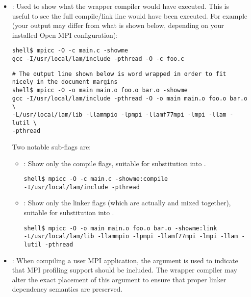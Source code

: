 \begin{itemize}
\item {}: Used to show what the wrapper compiler would
  have executed.  This is useful to see the full compile/link line
  would have been executed.  For example (your output may differ from
  what is shown below, depending on your installed Open MPI
  configuration):

  \lstset{style=lam-cmdline}
  \begin{lstlisting}
shell$ mpicc -O -c main.c -showme
gcc -I/usr/local/lam/include -pthread -O -c foo.c
  \end{lstlisting}
  \lstset{style=lam-cmdline}
  \begin{lstlisting}
# The output line shown below is word wrapped in order to fit nicely in the document margins
shell$ mpicc -O -o main main.o foo.o bar.o -showme
gcc -I/usr/local/lam/include -pthread -O -o main main.o foo.o bar.o \
-L/usr/local/lam/lib -llammpio -lpmpi -llamf77mpi -lmpi -llam -lutil \
-pthread 
  \end{lstlisting}


  Two notable sub-flags are:

  \begin{itemize}
  \item {}: Show only the compile flags,
    suitable for substitution into .
    
  \lstset{style=lam-cmdline}
  \begin{lstlisting}
shell$ mpicc -O -c main.c -showme:compile
-I/usr/local/lam/include -pthread
  \end{lstlisting}

  \item {}: Show only the linker flags (which are
    actually  and  mixed together),
    suitable for substitution into \envvar{LIBS}.

  \lstset{style=lam-cmdline}
  \begin{lstlisting}
shell$ mpicc -O -o main main.o foo.o bar.o -showme:link
-L/usr/local/lam/lib -llammpio -lpmpi -llamf77mpi -lmpi -llam -lutil -pthread 
  \end{lstlisting}

  \end{itemize}


\item {}: When compiling a user MPI application, the
   argument is used to indicate that MPI profiling
  support should be included.  The wrapper compiler may alter the
  exact placement of this argument to ensure that proper linker
  dependency semantics are preserved.
\end{itemize}

